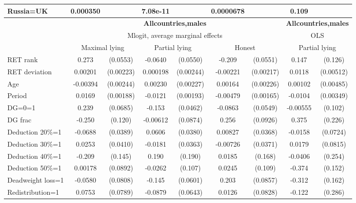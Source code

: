 \begin{tabular}{l|cccccc|cc}
Russia=UK       & 0.000350         &         & 7.08e-11         &         &0.0000678         &         &    0.109         &         \\
\hline\hline
&\multicolumn{6}{c|}{\bf All\space{}countries,\space{}males}&\multicolumn{2}{c}{\bf All\space{}countries,\space{}males}\\ &\multicolumn{6}{c|}{Mlogit, average marginal effects }&\multicolumn{2}{c}{OLS}\\
                &\multicolumn{2}{c}{Maximal lying}&\multicolumn{2}{c}{Partial lying}&\multicolumn{2}{c}{Honest}  &\multicolumn{2}{c}{Partial lying}\\
\hline
RET rank        &    0.273\sym{***}& (0.0553)&  -0.0640         & (0.0550)&   -0.209\sym{***}& (0.0551)&    0.147         &  (0.126)\\
RET deviation   &  0.00201         &(0.00223)& 0.000198         &(0.00244)& -0.00221         &(0.00217)&   0.0118\sym{**} &(0.00512)\\
Age             & -0.00394         &(0.00244)&  0.00230         &(0.00227)&  0.00164         &(0.00226)&  0.00102         &(0.00485)\\
Period          &   0.0169\sym{***}&(0.00188)&  -0.0121\sym{***}&(0.00193)& -0.00479\sym{***}&(0.00165)&  -0.0104\sym{***}&(0.00349)\\
DG=0=1          &    0.239\sym{***}& (0.0685)&   -0.153\sym{***}& (0.0462)&  -0.0863         & (0.0549)& -0.00555         &  (0.102)\\
DG frac         &   -0.250\sym{**} &  (0.120)& -0.00612         & (0.0874)&    0.256\sym{***}& (0.0926)&    0.375         &  (0.226)\\
Deduction 20\%=1&  -0.0688\sym{*}  & (0.0389)&   0.0606         & (0.0380)&  0.00827         & (0.0368)&  -0.0158         & (0.0724)\\
Deduction 30\%=1&   0.0253         & (0.0410)&  -0.0181         & (0.0363)& -0.00726         & (0.0371)&   0.0179         & (0.0815)\\
Deduction 40\%=1&   -0.209         &  (0.145)&    0.190         &  (0.190)&   0.0185         &  (0.168)&  -0.0406         &  (0.254)\\
Deduction 50\%=1&  0.00178         & (0.0892)&  -0.0262         &  (0.107)&   0.0245         &  (0.109)&   -0.374\sym{**} &  (0.152)\\
Deadweight loss=1&  -0.0580         & (0.0808)&   -0.145\sym{**} & (0.0601)&    0.203\sym{**} & (0.0857)&   -0.312\sym{*}  &  (0.162)\\
Redistribution=1&   0.0753         & (0.0789)&  -0.0879         & (0.0643)&   0.0126         & (0.0828)&   -0.122         &  (0.286)\\

\end{tabular}
